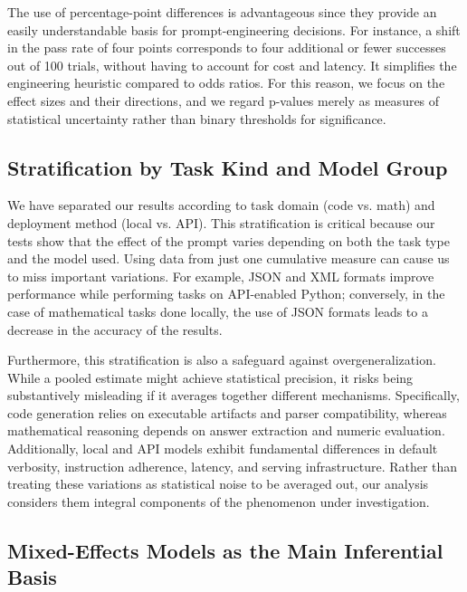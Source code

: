\documentclass{llncs}
\begin{document}
The use of percentage-point differences is advantageous since they provide an easily understandable basis for prompt-engineering decisions. For instance, a shift in the pass rate of four points corresponds to four additional or fewer successes out of 100 trials, without having to account for cost and latency. It simplifies the engineering heuristic compared to odds ratios. For this reason, we focus on the effect sizes and their directions, and we regard p-values merely as measures of statistical uncertainty rather than binary thresholds for significance.

\subsection{Stratification by Task Kind and Model Group}\label{stratification-by-task-kind-and-model-group}

We have separated our results according to task domain (code vs. math) and deployment method (local vs. API). This stratification is critical because our tests show that the effect of the prompt varies depending on both the task type and the model used. Using data from just one cumulative measure can cause us to miss important variations. For example, JSON and XML formats improve performance while performing tasks on API-enabled Python; conversely, in the case of mathematical tasks done locally, the use of JSON formats leads to a decrease in the accuracy of the results.

Furthermore, this stratification is also a safeguard against overgeneralization. While a pooled estimate might achieve statistical precision, it risks being substantively misleading if it averages together different mechanisms. Specifically, code generation relies on executable artifacts and parser compatibility, whereas mathematical reasoning depends on answer extraction and numeric evaluation. Additionally, local and API models exhibit fundamental differences in default verbosity, instruction adherence, latency, and serving infrastructure. Rather than treating these variations as statistical noise to be averaged out, our analysis considers them integral components of the phenomenon under investigation.

\subsection{Mixed-Effects Models as the Main Inferential Basis}\label{fixed-effect-and-mixed-effect-considerations}
\end{document}
